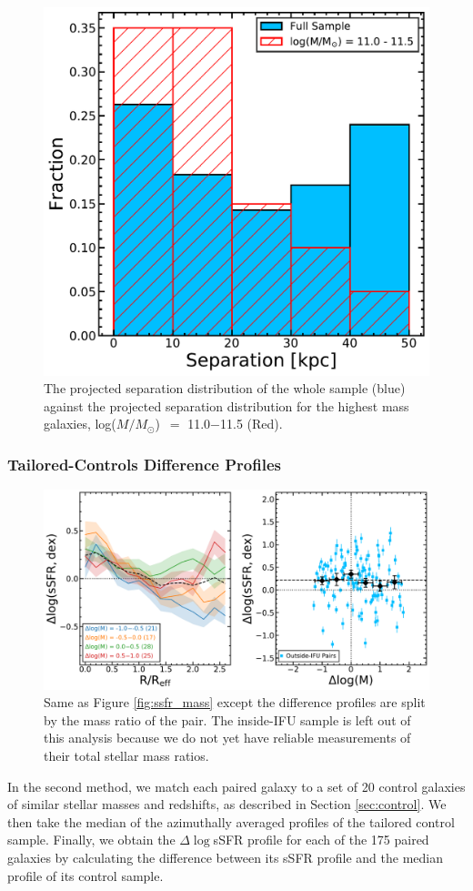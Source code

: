 \documentclass[iop,revtex4,twocolumn,apj,numberedappendix,appendixfloats]{emulateapj}
\newcommand{\logm}{log($M/M_{\odot}$)}
\begin{document}
\begin{figure}
\centering
\includegraphics[width=0.8\linewidth]{fig/sep_hist.pdf}
\caption[]{The projected separation distribution of the whole sample (blue) against the projected separation distribution for the highest mass galaxies, \logm\ $=$ 11.0$-$11.5 (Red). }
\label{fig:sep_hist}
\end{figure}

\subsubsection{Tailored-Controls Difference Profiles}\label{sec:tailored}
\begin{figure}
\centering
\includegraphics[width=0.8\linewidth]{fig/ssfr_dm.pdf}
\caption[]{Same as Figure \ref{fig:ssfr_mass} except the difference profiles are split by the mass ratio of the pair. The inside-IFU sample is left out of this analysis because we do not yet have reliable measurements of their total stellar mass ratios.}
\label{fig:ssfr_dm}
\end{figure}
In the second method, we match each paired galaxy to a set of 20 control galaxies of similar stellar masses and redshifts, as described in Section \ref{sec:control}. We then take the median of the azimuthally averaged profiles of the tailored control sample. Finally, we obtain the $\Delta\log$sSFR profile for each of the 175 paired galaxies by calculating the difference between its sSFR profile and the median profile of its control sample.
\end{document}
